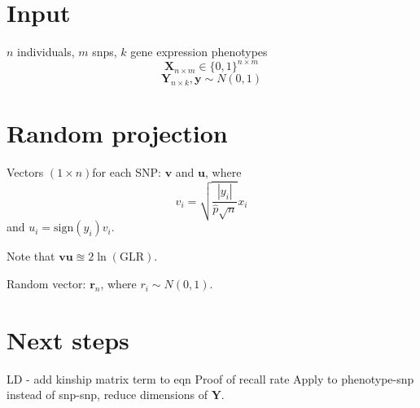 \documentclass{article}
\newcommand{\mb}[1]{\mathbf{#1}}
\begin{document}
	
	\section{Input}
	$n$ individuals, $m$ snps, $k$ gene expression phenotypes
	\[\mb{X}_{n \times m} \in \{0,1\}^{n \times m}\]
	\[\mb{Y}_{n \times k}, \mb{y} \sim N(0,1)\]
	
	
	
	\section{Random projection}
	Vectors $(1 \times n) $for each SNP: $\mb{v}$ and $\mb{u}$, where
	\[v_i = \sqrt{\frac{|y_i|}{\hat{p} \sqrt{n}}}x_i\]
	and $u_i = \text{sign}(y_i)v_i$.
	
	Note that $\mb{vu} \approxeq 2\ln(\text{GLR})$.
	
	Random vector: $\mb{r}_{n}$, where $r_i \sim N(0,1)$. 
	
	
	\section{Next steps}
	LD - add kinship matrix term to eqn
	Proof of recall rate
	Apply to phenotype-snp instead of snp-snp, reduce dimensions of $\mb{Y}$.
	
\end{document}
